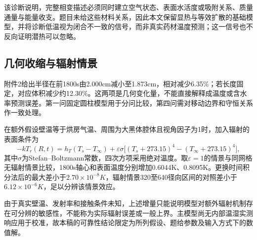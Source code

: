 该诊断说明，完整相变描述必须同时建立空气状态、表面水活度或吸附关系、质量通量与能量收支。题目未给这些材料关系，因此本文保留显热与等效扩散的基础模型，并将诊断低温视为闭合不一致的信号，而非真实药材温度预测；这一信号也不反向证明潜热可以忽略。

\subsection{几何收缩与辐射情景}
附件2给出半径在前1800\unit{s}由2.000\unit{cm}减小至1.873\unit{cm}，相对减少6.35\%；若长度固定，对应体积减少约12.30\%。这两项是几何变化量，不能直接解释成温度或含水率预测误差。第一问固定圆柱模型用于分问比较，第四问需对移动边界和守恒关系作一致处理。

在额外假设壁温等于烘房气温、周围为大黑体腔体且视角因子为1时，加入辐射的表面条件为
\begin{equation}
-kT_r(R,t)=h_T(T_s-T_\infty)
+\varepsilon\sigma\big[(T_s+273.15)^4-(T_\infty+273.15)^4\big],
\label{eq:radiation}
\end{equation}
其中$\sigma$为Stefan--Boltzmann常数，四次方项采用绝对温度。取$\varepsilon=1$的情景与同网格无辐射情景比较，1800\unit{s}轴心和表面温度分别增加0.6044\unit{K}、0.8095\unit{K}。更换时间积分法后的最大差小于$2.70\times10^{-8}\unit{K}$，辐射情景320至640径向区间的对照差小于$6.12\times10^{-6}\unit{K}$，足以分辨该情景效应。

由于真实壁温、发射率和接触条件未知，上述增量只能说明模型对额外辐射机制存在可分辨的敏感性，不能称为实际辐射误差或一般上界。主模型尚无内部温湿实测响应用于校准，故本稿的可靠性结论限定为所列假设、题给参数及输入方式下的数值解。
